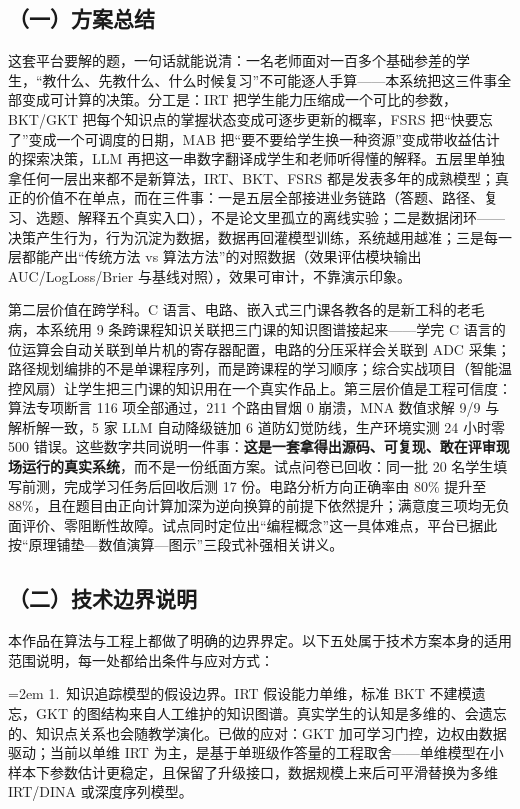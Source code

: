 \documentclass[zihao=-4,a4paper,UTF8,fontset=windows]{ctexart}
\begin{document}
\subsection{（一）方案总结}


这套平台要解的题，一句话就能说清：一名老师面对一百多个基础参差的学生，“教什么、先教什么、什么时候复习”不可能逐人手算——本系统把这三件事全部变成可计算的决策。分工是：IRT 把学生能力压缩成一个可比的参数，BKT/GKT 把每个知识点的掌握状态变成可逐步更新的概率，FSRS 把“快要忘了”变成一个可调度的日期，MAB 把“要不要给学生换一种资源”变成带收益估计的探索决策，LLM 再把这一串数字翻译成学生和老师听得懂的解释。五层里单独拿任何一层出来都不是新算法，IRT、BKT、FSRS 都是发表多年的成熟模型；真正的价值不在单点，而在三件事：一是五层全部接进业务链路（答题、路径、复习、选题、解释五个真实入口），不是论文里孤立的离线实验；二是数据闭环——决策产生行为，行为沉淀为数据，数据再回灌模型训练，系统越用越准；三是每一层都能产出“传统方法 vs 算法方法”的对照数据（效果评估模块输出 AUC/LogLoss/Brier 与基线对照），效果可审计，不靠演示印象。



第二层价值在跨学科。C 语言、电路、嵌入式三门课各教各的是新工科的老毛病，本系统用 9 条跨课程知识关联把三门课的知识图谱接起来——学完 C 语言的位运算会自动关联到单片机的寄存器配置，电路的分压采样会关联到 ADC 采集；路径规划编排的不是单课程序列，而是跨课程的学习顺序；综合实战项目（智能温控风扇）让学生把三门课的知识用在一个真实作品上。第三层价值是工程可信度：算法专项断言 116 项全部通过，211 个路由冒烟 0 崩溃，MNA 数值求解 9/9 与解析解一致，5 家 LLM 自动降级链加 6 道防幻觉防线，生产环境实测 24 小时零 500 错误。这些数字共同说明一件事：\textbf{这是一套拿得出源码、可复现、敢在评审现场运行的真实系统}，而不是一份纸面方案。试点问卷已回收：同一批 20 名学生填写前测，完成学习任务后回收后测 17 份。电路分析方向正确率由 80\% 提升至 88\%，且在题目由正向计算加深为逆向换算的前提下依然提升；满意度三项均无负面评价、零阻断性故障。试点同时定位出“编程概念”这一具体难点，平台已据此按“原理铺垫—数值演算—图示”三段式补强相关讲义。

\subsection{（二）技术边界说明}


本作品在算法与工程上都做了明确的边界界定。以下五处属于技术方案本身的适用范围说明，每一处都给出条件与应对方式：

\noindent\hangindent=2em 1.~知识追踪模型的假设边界。IRT 假设能力单维，标准 BKT 不建模遗忘，GKT 的图结构来自人工维护的知识图谱。真实学生的认知是多维的、会遗忘的、知识点关系也会随教学演化。已做的应对：GKT 加可学习门控，边权由数据驱动；当前以单维 IRT 为主，是基于单班级作答量的工程取舍——单维模型在小样本下参数估计更稳定，且保留了升级接口，数据规模上来后可平滑替换为多维 IRT/DINA 或深度序列模型。
\end{document}
